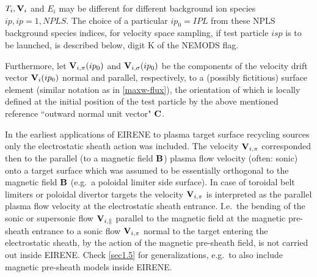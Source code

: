 $T_i,\mathbf{V}_i$ and $E_i$ may be different for different background ion species
$ip,  ip = 1,NPLS$.
The choice of a particular $ip_0=IPL$ from these NPLS background species
indices, for velocity space sampling, if test particle $isp$ is to be launched,
is described below, digit K of the NEMODS flag.

Furthermore, let $\mathbf{V}_{i,\pi}(ip_0)$ and $\mathbf{V}_{i,\sigma}(ip_0)$ be the
components of the velocity drift vector $\mathbf{V}_i(ip_0)$ normal and parallel,
respectively, to a (possibly fictitious) surface element (similar  notation as
in \cref{maxw-flux}), the orientation of which is locally defined at the
initial position of the test particle by the above mentioned reference
``outward normal unit vector" $\mathbf{C}$.

In the earliest applications of EIRENE to plasma target surface recycling
sources only the electrostatic sheath action was included.
The velocity $\mathbf{V}_{i,\pi}$ corresponded then to the parallel (to a magnetic
field $\mathbf{B}$) plasma flow velocity (often: sonic) onto a target surface which
was assumed to be essentially orthogonal to the magnetic field $\mathbf{B}$ (e.g.\ a
poloidal limiter side surface).
In case of toroidal belt limiters or poloidal divertor targets the velocity
$\mathbf{V}_{i,\pi}$ is interpreted as the parallel plasma flow velocity at the
electrostatic sheath entrance.
I.e.\ the bending of the sonic or supersonic flow $\mathbf{V}_{i,\|}$ parallel to the
magnetic field at the magnetic pre-sheath entrance to a sonic flow
$\mathbf{V}_{i,\pi}$ normal to the target entering the electrostatic sheath, by the
action of the magnetic pre-sheath field, is not carried out inside EIRENE.
Check \cref{sec1.5} for generalizations, e.g.\ to also include magnetic
pre-sheath models inside EIRENE.

